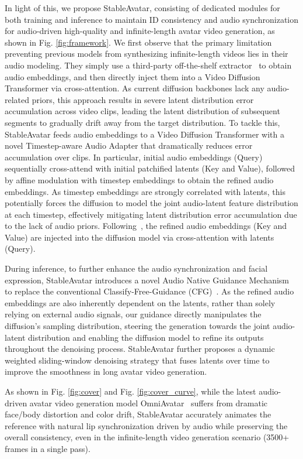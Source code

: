 In light of this, we propose StableAvatar, consisting of dedicated modules for both training and inference to maintain ID consistency and audio synchronization for audio-driven high-quality and infinite-length avatar video generation, as shown in Fig. \ref{fig:framework}. 
We first observe that the primary limitation preventing previous models from synthesizing infinite-length videos lies in their audio modeling. They simply use a third-party off-the-shelf extractor~\cite{baevski2020wav2vec} to obtain audio embeddings, and then directly inject them into a Video Diffusion Transformer via cross-attention. As current diffusion backbones lack any audio-related priors, this approach results in severe latent distribution error accumulation across video clips, leading the latent distribution of subsequent segments to gradually drift away from the target distribution.
To tackle this, StableAvatar feeds audio embeddings to a Video Diffusion Transformer with a novel Timestep-aware Audio Adapter that dramatically reduces error accumulation over clips.
In particular, initial audio embeddings (Query) sequentially cross-attend with initial patchified latents (Key and Value), followed by affine modulation with timestep embeddings to obtain the refined audio embeddings. 
As timestep embeddings are strongly correlated with latents, this potentially forces the diffusion to model the joint audio-latent feature distribution at each timestep, effectively mitigating latent distribution error accumulation due to the lack of audio priors.
Following~\cite{wang2025fantasytalking, kong2025let, gan2025omniavatar}, the refined audio embeddings (Key and Value) are injected into the diffusion model via cross-attention with latents (Query).

During inference, to further enhance the audio synchronization and facial expression, StableAvatar introduces a novel Audio Native Guidance Mechanism to replace the conventional Classify-Free-Guidance (CFG)~\cite{ho2022classifier}. As the refined audio embeddings are also inherently dependent on the latents, rather than solely relying on external audio signals, our guidance directly manipulates the diffusion’s sampling distribution, steering the generation towards the joint audio-latent distribution and enabling the diffusion model to refine its outputs throughout the denoising process.
StableAvatar further proposes a dynamic weighted sliding-window denoising strategy that fuses latents over time to improve the smoothness in long avatar video generation.

As shown in Fig. \ref{fig:cover} and Fig. \ref{fig:cover_curve}, while the latest audio-driven avatar video generation model OmniAvatar~\cite{gan2025omniavatar} suffers from dramatic face/body distortion and color drift, StableAvatar accurately animates the reference with natural lip synchronization driven by audio while preserving the overall consistency, even in the infinite-length video generation scenario (3500+ frames in a single pass).

